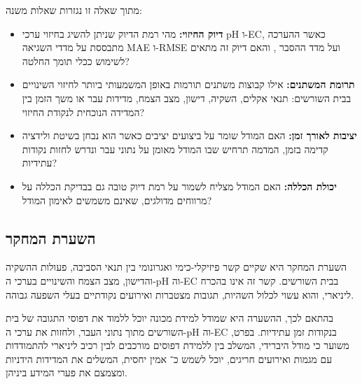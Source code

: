 מתוך שאלה זו נגזרות שאלות משנה:

\begin{itemize}
    \item \textbf{דיוק החיזוי:} מהי רמת הדיוק שניתן להשיג בחיזוי ערכי pH ו-EC, כאשר ההערכה מתבססת על מדדי השגיאה MAE ו-RMSE ועל מדד ההסבר \Rtwo{}, והאם דיוק זה מתאים לשימוש ככלי תומך החלטה?
    \item \textbf{תרומת המשתנים:} אילו קבוצות משתנים תורמות באופן המשמעותי ביותר לחיזוי השינויים בבית השורשים: תנאי אקלים, השקיה, דישון, מצב הצמח, מדידות עבר או משך הזמן בין המדידה הנוכחית לנקודת החיזוי?
    \item \textbf{יציבות לאורך זמן:} האם המודל שומר על ביצועים יציבים כאשר הוא נבחן בשיטת ולידציה קדימה בזמן, המדמה תרחיש שבו המודל מאומן על נתוני עבר ונדרש לחזות נקודות עתידיות?
    \item \textbf{יכולת הכללה:} האם המודל מצליח לשמור על רמת דיוק טובה גם בבדיקת הכללה על מרווחים מדולגים, שאינם משמשים לאימון המודל?
\end{itemize}

\subsection{השערת המחקר}
השערת המחקר היא שקיים קשר פיזיקלי-כימי ואגרונומי בין תנאי הסביבה, פעולות ההשקיה והדישון, מצב הצמח והשינויים בערכי ה-pH וה-EC בבית השורשים. קשר זה אינו בהכרח ליניארי, והוא עשוי לכלול השהיות, תגובות מצטברות ואירועים נקודתיים בעלי השפעה גבוהה.

בהתאם לכך, ההשערה היא שמודל למידת מכונה יוכל ללמוד את דפוסי התגובה של בית השורשים מתוך נתוני העבר, ולחזות את ערכי ה-pH וה-EC בנקודות זמן עתידיות. בפרט, משוער כי מודל היברידי, המשלב בין \GB{} ללמידת דפוסים מורכבים לבין רכיב ליניארי להתמודדות עם מגמות ואירועים חריגים, יוכל לשמש כ־\SoftSensor{} אמין יחסית, המשלים את המדידות הידניות ומצמצם את פערי המידע ביניהן.
